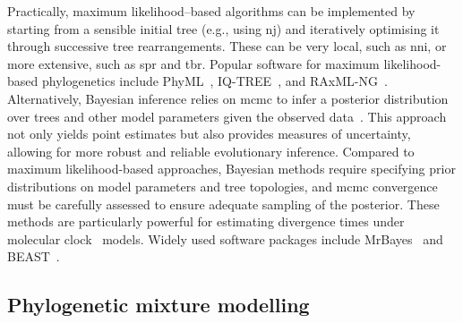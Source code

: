 Practically, maximum likelihood–based algorithms can be implemented by starting from a sensible initial tree (e.g., using \gls{nj}) and iteratively optimising it through successive tree rearrangements. These can be very local, such as \gls{nni}, or more extensive, such as \gls{spr} and \gls{tbr}. Popular software for maximum likelihood-based phylogenetics include PhyML~\cite{guindon2003}, IQ-TREE~\cite{minh2020}, and RAxML-NG~\cite{kozlov2019}. Alternatively, Bayesian inference relies on \gls{mcmc} to infer a posterior distribution over trees and other model parameters given the observed data~\cite{huelsenbeck2001, drummond2015}. This approach not only yields point estimates but also provides measures of uncertainty, allowing for more robust and reliable evolutionary inference. Compared to maximum likelihood-based approaches, Bayesian methods require specifying prior distributions on model parameters and tree topologies, and \gls{mcmc} convergence must be carefully assessed to ensure adequate sampling of the posterior. These methods are particularly powerful for estimating divergence times under molecular clock~\cite{zuckerkandl1962, zuckerkandl1965} models. Widely used software packages include MrBayes~\cite{huelsenbeck2001} and BEAST~\cite{bouckaert2014, baele2025}.


\subsection{Phylogenetic mixture modelling}

